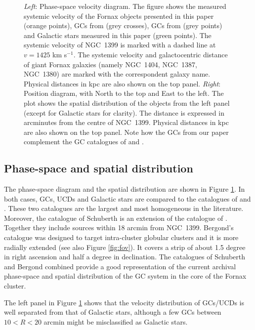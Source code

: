 \documentclass[useAMS,usenatbib]{mn2e}
\begin{document}
\begin{figure}
\caption{\textit{Left}: Phase-space velocity diagram. The figure shows the 
measured systemic velocity of the Fornax objects presented in this paper 
(orange points), GCs from \citet{Schuberth} (grey crosses), GCs from 
\citet{Bergond07} (grey points) and Galactic stars measured in this paper 
(green points). The systemic velocity of NGC~1399 is marked with a dashed line 
at $v = 1425$ km s$^{-1}$. The systemic velocity and galactocentric distance of 
giant Fornax galaxies (namely NGC~1404, NGC~1387, NGC~1380) are marked with 
the correspondent galaxy name. 
Physical distances in kpc are also shown on the top panel. 
\textit{Right}: Position diagram, with North to the top and East to the left. 
The plot shows the spatial distribution of the objects from the left panel 
(except for Galactic stars for clarity). The distance is expressed in 
arcminutes from the centre of NGC~1399. Physical distances in kpc are also 
shown on the top panel.  Note how the GCs from our paper complement the GC 
catalogues of \citet{Schuberth} and \citet{Bergond07}. }
\label{fig:phase-space}
\end{figure}

\subsection{Phase-space and spatial distribution}

The phase-space diagram and the spatial distribution are shown in Figure 
\ref{fig:phase-space}. In both cases, GCs, UCDs and Galactic stars are compared 
to the catalogues of \citet{Bergond07} and \citet{Schuberth}. These two 
catalogues are the largest and most homogeneous in the literature. Moreover, 
the catalogue of Schuberth is an extension of the catalogue of 
\citet{Dirsch04}. Together they include sources within 18 arcmin from NGC~1399. 
Bergond's catalogue was designed to target intra-cluster globular clusters and 
it is more radially extended (see also Figure \ref{fig:fov}). It covers a strip 
of about 1.5 degree in right ascension and half a degree in declination. The 
catalogues of Schuberth and Bergond combined provide a good representation of 
the current archival phase-space and spatial distribution of the GC system in 
the core of the Fornax cluster. 

The left panel in Figure \ref{fig:phase-space} shows that the velocity 
distribution of GCs/UCDs is well separated from that of Galactic stars, 
although a few GCs between $10<R<20$ arcmin might be misclassified as Galactic 
stars. 
\end{document}
